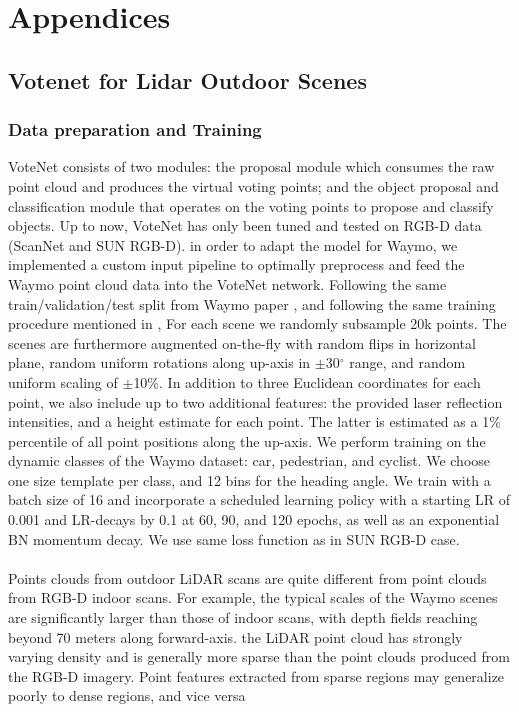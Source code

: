 \documentclass[10pt,twocolumn,letterpaper]{article}
\begin{document}
{\small


}


\appendix
\section*{Appendices}
\renewcommand{\thesubsection}{\Alph{subsection}}

\subsection{Votenet for Lidar Outdoor Scenes}\label{appendix:votenet}

\subsubsection {Data preparation and Training}
VoteNet consists of two modules: the proposal module which consumes the raw point cloud and produces the virtual voting points; and the object proposal and classification module that operates on the voting points to propose and classify objects. Up to now, VoteNet has only been tuned and tested on RGB-D data (ScanNet and SUN RGB-D). in order to adapt the model for Waymo, we implemented a custom input pipeline to optimally preprocess and feed the Waymo point cloud data into the VoteNet network.
Following the same train/validation/test split from Waymo paper \cite{cite waymo}, and following the same training procedure mentioned in \cite{votenet}, For each scene we randomly subsample 20k points. The scenes are furthermore augmented on-the-fly with random flips in horizontal plane, random uniform rotations along up-axis in  $\pm$30$^{\circ}$ range, and random uniform scaling of $\pm$10\%. In addition to three Euclidean coordinates for each point, we also include up to two additional features: the provided laser reflection intensities, and a height estimate for each point. The latter is estimated as a 1\% percentile of all point positions along the up-axis.
We perform training on the dynamic classes of the Waymo dataset: car, pedestrian, and cyclist. We choose one size template per class, and 12 bins for the heading angle. We train with a batch size of 16 and incorporate a scheduled learning policy with a starting LR of 0.001 and LR-decays by 0.1 at 60, 90, and 120 epochs, as well as an exponential BN momentum decay. We use same loss function as in SUN RGB-D case.
\paragraph{}
Points clouds from outdoor LiDAR scans are quite different from point clouds from RGB-D indoor scans. For example, the typical scales of the Waymo scenes are significantly larger than those of indoor scans, with depth fields reaching beyond 70 meters along forward-axis. the LiDAR point cloud has strongly varying density and is generally more sparse than the point clouds produced from the RGB-D imagery. Point features extracted from sparse regions may generalize poorly to dense regions, and vice versa
\end{document}

